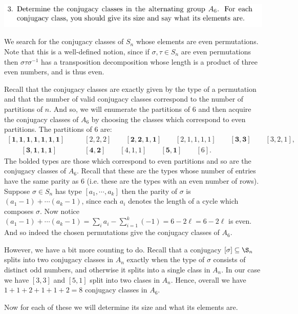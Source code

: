 \documentclass[12pt,letterpaper,boxed]{hmcpset}
\newcommand{\inv}{^{-1}}
\begin{document}
\begin{problem}
	\includegraphics[scale=0.8]{3.png}
	\hfill
\end{problem}
\begin{solution}
We search for the conjugacy classes of $S_n$ whose elements are even
permutations. Note that this is a well-defined notion, since if
$\sigma, \tau \in S_n$ are even permutations then $\sigma \tau
\sigma\inv$ has a transposition decomposition whose length is a
product of three even numbers, and is thus even.

Recall that the conjugacy classes are exactly given by the type of a
permutation and that the number of valid conjugacy classes
correspond to the number of partitions of $n$. And so, we will
enumerate the partitions of $6$ and then acquire the conjugacy classes
of $A_6$ by choosing the classes which correspond to even partitions.
The partitions of $6$ are:
\begin{align*}
	\mathbf{[1,1,1,1,1,1,1]} &\qquad [2,2,2] \qquad \mathbf{[2,2,1,1]} \qquad [2,1,1,1,1]
	\qquad \mathbf{[3,3]} \qquad [3,2,1], \\ \qquad \mathbf{[3,1,1,1]}
	&\qquad \mathbf{[4,2]} \qquad [4,1,1] \qquad \mathbf{[5,1]} \qquad [6]. 
\end{align*}
The bolded types are those which correspond to even partitions and so
are the conjugacy classes of $A_6$. Recall that these are the types
whose number of entries have the same parity as $6$ (i.e. these are
the types with an even number of rows). Suppose $\sigma \in S_n$ has
type $[a_1, \cdots, a_k]$ then the parity of $\sigma$ is 
$(a_1 - 1) + \cdots (a_k -1)$, since each $a_i$ denotes the length of
a cycle which composes $\sigma$. Now notice 
$(a_1 -1) + \cdots (a_k -1) = \sum_i a_i - \sum_{i=1}^{k} (-1) = 6 -
2\ell = 6 - 2\ell$ is even. And so indeed the chosen permutations give
the conjugacy classes of $A_6$. 

However, we have a bit more counting to do. Recall that a conjugacy
$[\sigma] \subseteq \S_n$ splits into two conjugacy classes in $A_n$
exactly when the type of $\sigma$ consists of distinct odd numbers,
and otherwise it splits into a single class in $A_n$. 
In our case we have $[3,3]$ and $[5,1]$ split into two clases in
$A_n$. Hence, overall we have $1 + 1 + 2 + 1 + 1 + 2 = 8$ conjugacy
classes in $A_6$. 

Now for each of these we will determine its size and what its elements
are. 



\end{solution}
\end{document}

